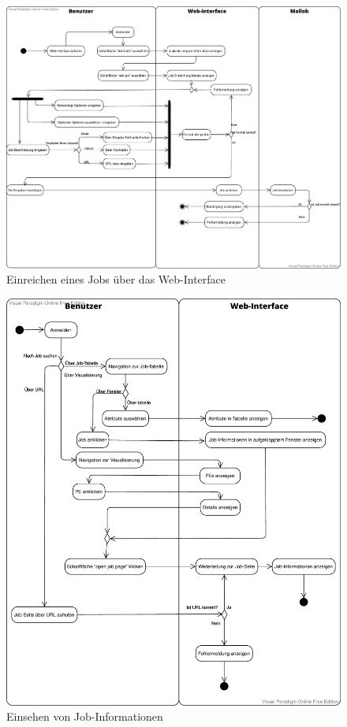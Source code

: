 \begin{figure}[H]
    \centering
    \includegraphics[width=\textwidth]{images-interface/Job_einreichen_Aktivitaetsdiagramm.pdf}
    \caption{Einreichen eines Jobs über das Web-Interface}
\end{figure}

\begin{figure}[H]
    \centering
    \includegraphics[width=\textwidth]{images-interface/get_infos.pdf}
    \caption{Einsehen von Job-Informationen}
\end{figure}